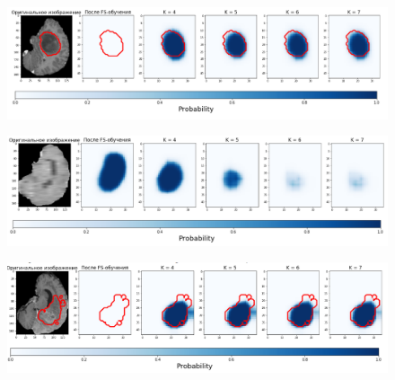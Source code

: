   \begin{figure}[h!] 
  \center
  \includegraphics [scale=0.7] {images/good_20.png}
\end{figure}

  \begin{figure}[h!] 
  \center
  \includegraphics [scale=0.7] {images/good_21.png}
  \end{figure} 
  
  \begin{figure}[h!] 
  \center
  \includegraphics [scale=0.7] {images/good_22.png}
\end{figure}



\clearpage